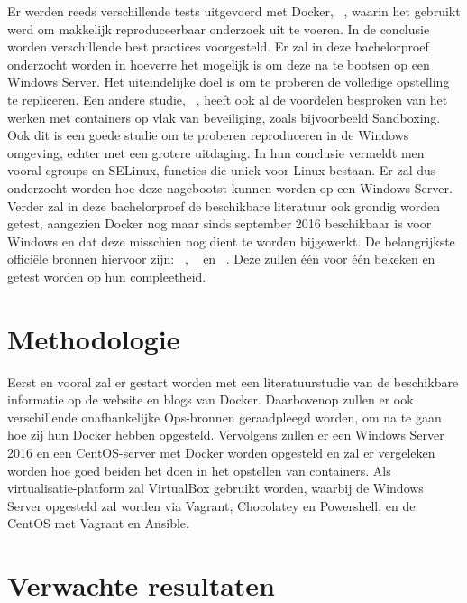 \documentclass[fleqn,10pt]{voorstel}
\begin{document}
	Er werden reeds verschillende tests uitgevoerd met Docker, ~\autocite{Boettiger2014}, waarin het gebruikt werd om makkelijk reproduceerbaar onderzoek uit te voeren. In de conclusie worden verschillende best practices voorgesteld. Er zal in deze bachelorproef onderzocht worden in hoeverre het mogelijk is om deze na te bootsen op een Windows Server. Het uiteindelijke doel is om te proberen de volledige opstelling te repliceren.
	Een andere studie, ~\autocite{Salman2016}, heeft ook al de voordelen besproken van het werken met containers op vlak van beveiliging, zoals bijvoorbeeld Sandboxing. Ook dit is een goede studie om te proberen reproduceren in de Windows omgeving, echter met een grotere uitdaging. In hun conclusie vermeldt men vooral cgroups en SELinux, functies die uniek voor Linux bestaan. Er zal dus onderzocht worden hoe deze nagebootst kunnen worden op een Windows Server.
	Verder zal in deze bachelorproef de beschikbare literatuur ook grondig worden getest, aangezien Docker nog maar sinds september 2016 beschikbaar is voor Windows en dat deze misschien nog dient te worden bijgewerkt.
	De belangrijkste officiële bronnen hiervoor zijn: ~\autocite{Docker2016}, ~\autocite{Friis2016} en ~\autocite{Container2016}. Deze zullen één voor één bekeken en getest worden op hun compleetheid.
	
	
	\section{Methodologie}
	\label{sec:methodologie}
	
	Eerst en vooral zal er gestart worden met een literatuurstudie van de beschikbare informatie op de website en blogs van Docker. Daarbovenop zullen er ook verschillende onafhankelijke Ops-bronnen geraadpleegd worden, om na te gaan hoe zij hun Docker hebben opgesteld.
	Vervolgens zullen er een Windows Server 2016 en een CentOS-server met Docker worden opgesteld en zal er vergeleken worden hoe goed beiden het doen in het opstellen van containers.
	Als virtualisatie-platform zal VirtualBox gebruikt worden, waarbij de Windows Server opgesteld zal worden via Vagrant, Chocolatey en Powershell, en de CentOS met Vagrant en Ansible.
	
	\section{Verwachte resultaten}
	\label{sec:verwachte_resultaten}
	
\end{document}
